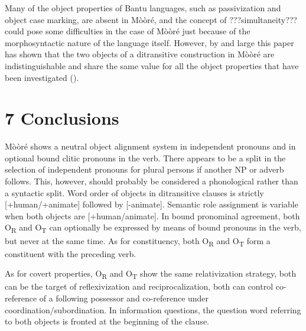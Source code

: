 \documentclass[output=paper]{langsci/langscibook}
\begin{document}
{{{{{{{Many of the object properties of Bantu languages, such as passivization and object case marking, are absent in M\`{o}\`{o}r\'{e}, and the concept of ???simultaneity??? could pose some difficulties in the case of M\`{o}\`{o}r\'{e} just because of the morphosyntactic nature of the language itself. However, by and large this paper has shown that the two objects of a ditransitive construction in M\`{o}\`{o}r\'{e} are indistinguishable and share the same value for all the object properties that have been investigated ().  

\chapter{7 Conclusions}

M\`{o}\`{o}r\'{e} shows a neutral object alignment system in independent pronouns and in optional bound clitic pronouns in the verb. There appears to be a split in the selection of independent pronouns for plural persons if another NP or adverb follows. This, however, should probably be considered a phonological rather than a syntactic split. Word order of objects in ditransitive clauses is strictly [+human/+animate] followed by [-animate]. Semantic role assignment is variable when both objects are [+human/animate]. In bound pronominal agreement, both O\textsubscript{R} and O\textsubscript{T} can optionally be expressed by means of bound pronouns in the verb, but never at the same time. As for constituency, both O\textsubscript{R} and O\textsubscript{T} form a constituent with the preceding verb. 

As for covert properties, O\textsubscript{R} and O\textsubscript{T} show the same relativization strategy, both can be the target of reflexivization and reciprocalization, both can control co-reference of a following possessor and co-reference under coordination/subordination. In information questions, the question word referring to both objects is fronted at the beginning of the clause. 

}}}}}}}
\end{document}
